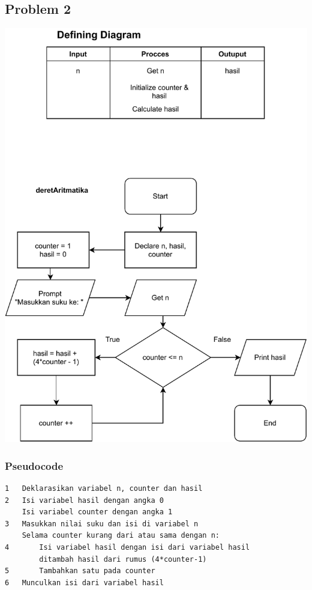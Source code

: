 \documentclass[
  12pt,
  answers  
]{exam}
\begin{document}
	\subsection*{Problem 2}
	\begin{center}
		\includegraphics{pdf/Problem2.pdf}
	\end{center}

	\pagebreak
	\subsubsection*{Pseudocode}
	\begin{lstlisting}
1	Deklarasikan variabel n, counter dan hasil
2	Isi variabel hasil dengan angka 0
	Isi variabel counter dengan angka 1
3	Masukkan nilai suku dan isi di variabel n
	Selama counter kurang dari atau sama dengan n:
4		Isi variabel hasil dengan isi dari variabel hasil
		ditambah hasil dari rumus (4*counter-1)
5		Tambahkan satu pada counter
6	Munculkan isi dari variabel hasil
	\end{lstlisting}
	\pagebreak
\end{document}
